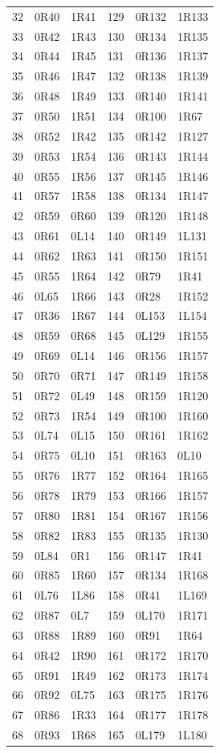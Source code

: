 \begin{longtable}{rll@{\hspace{1.2cm}}rll}
32&0R40&1R41&129&0R132&1R133\\
33&0R42&1R43&130&0R134&1R135\\
34&0R44&1R45&131&0R136&1R137\\
35&0R46&1R47&132&0R138&1R139\\
36&0R48&1R49&133&0R140&1R141\\
37&0R50&1R51&134&0R100&1R67\\
38&0R52&1R42&135&0R142&1R127\\
39&0R53&1R54&136&0R143&1R144\\
40&0R55&1R56&137&0R145&1R146\\
41&0R57&1R58&138&0R134&1R147\\
42&0R59&0R60&139&0R120&1R148\\
43&0R61&0L14&140&0R149&1L131\\
44&0R62&1R63&141&0R150&1R151\\
45&0R55&1R64&142&0R79&1R41\\
46&0L65&1R66&143&0R28&1R152\\
47&0R36&1R67&144&0L153&1L154\\
48&0R59&0R68&145&0L129&1R155\\
49&0R69&0L14&146&0R156&1R157\\
50&0R70&0R71&147&0R149&1R158\\
51&0R72&0L49&148&0R159&1R120\\
52&0R73&1R54&149&0R100&1R160\\
53&0L74&0L15&150&0R161&1R162\\
54&0R75&0L10&151&0R163&0L10\\
55&0R76&1R77&152&0R164&1R165\\
56&0R78&1R79&153&0R166&1R157\\
57&0R80&1R81&154&0R167&1R156\\
58&0R82&1R83&155&0R135&1R130\\
59&0L84&0R1&156&0R147&1R41\\
60&0R85&1R60&157&0R134&1R168\\
61&0L76&1L86&158&0R41&1L169\\
62&0R87&0L7&159&0L170&1R171\\
63&0R88&1R89&160&0R91&1R64\\
64&0R42&1R90&161&0R172&1R170\\
65&0R91&1R49&162&0R173&1R174\\
66&0R92&0L75&163&0R175&1R176\\
67&0R86&1R33&164&0R177&1R178\\
68&0R93&1R68&165&0L179&1L180\\

\end{longtable}
